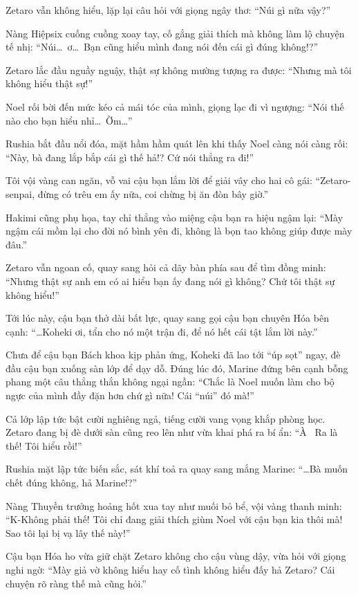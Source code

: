 \documentclass[../main.tex]{subfiles}
\begin{document}
Zetaro vẫn không hiểu, lặp lại câu hỏi với giọng ngây thơ: ``Núi gì nữa vậy?''

Nàng Hiệpsix cuống cuồng xoay tay, cố gắng giải thích mà không làm lộ chuyện tế nhị: ``Núi\dots\ ơ\dots\ Bạn cũng hiểu mình đang nói đến cái gì đúng không!?''

Zetaro lắc đầu nguầy nguậy, thật sự không mường tượng ra được: ``Nhưng mà tôi không hiểu thật sự!''

Noel rối bời đến mức kéo cả mái tóc của mình, giọng lạc đi vì ngượng: ``Nói thế nào cho bạn hiểu nhỉ\dots\ Ờm\dots''

Rushia bắt đầu nổi đóa, mặt hầm hầm quát lên khi thấy Noel càng nói càng rối: ``Này, bà đang lắp bắp cái gì thế hả!? Cứ nói thẳng ra đi!''

Tôi vội vàng can ngăn, vỗ vai cậu bạn lắm lời để giải vây cho hai cô gái: ``Zetaro-senpai, đừng có trêu em ấy nữa, coi chừng bị ăn đòn bây giờ.''

Hakimi cũng phụ họa, tay chỉ thẳng vào miệng cậu bạn ra hiệu ngậm lại: ``Mày ngậm cái mồm lại cho đời nó bình yên đi, không là bọn tao không giúp được mày đâu.''

Zetaro vẫn ngoan cố, quay sang hỏi cả dãy bàn phía sau để tìm đồng minh: ``Nhưng thật sự anh em có ai hiểu bạn ấy đang nói gì không? Chứ tôi thật sự không hiểu!''

Tới lúc này, cậu bạn thở dài bất lực, quay sang gọi cậu bạn chuyên Hóa bên cạnh: ``\dots Koheki ơi, tẩn cho nó một trận đi, để nó hết cái tật lắm lời này.''

Chưa để cậu bạn Bách khoa kịp phản ứng, Koheki đã lao tới ``úp sọt'' ngay, đè đầu cậu bạn xuống sàn lớp để dạy dỗ. Đúng lúc đó, Marine đứng bên cạnh bỗng phang một câu thẳng thắn không ngại ngần: ``Chắc là Noel muốn làm cho bộ ngực của mình đầy đặn hơn chứ gì nữa! Cái ``núi'' đó mà!''

Cả lớp lập tức bật cười nghiêng ngả, tiếng cười vang vọng khắp phòng học. Zetaro đang bị đè dưới sàn cũng reo lên như vừa khai phá ra bí ẩn: ``À~ Ra là thế! Tôi hiểu rồi!''

Rushia mặt lập tức biến sắc, sát khí toả ra quay sang mắng Marine: ``\dots Bà muốn chết đúng không, hả Marine!?''

Nàng Thuyền trưởng hoảng hốt xua tay như muối bỏ bể, vội vàng thanh minh: ``K-Không phải thế! Tôi chỉ đang giải thích giùm Noel với cậu bạn kia thôi mà! Sao tôi lại bị vạ lây thế này!''

Cậu bạn Hóa ho vừa giữ chặt Zetaro không cho cậu vùng dậy, vừa hỏi với giọng nghi ngờ: ``Mày giả vờ không hiểu hay cố tình không hiểu đấy hả Zetaro? Cái chuyện rõ ràng thế mà cũng hỏi.''
\end{document}
